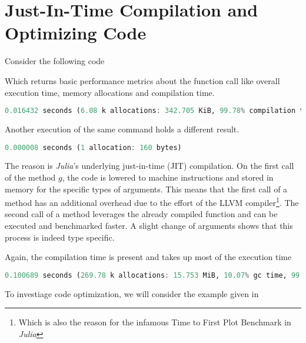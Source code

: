 \section{ Just-In-Time Compilation and Optimizing Code}
\label{JM:sec:design}

Consider the following code



Which returns basic performance metrics about the function call like overall execution time, memory allocations and compilation time.

\begin{lstlisting}[language=Julia]
    0.016432 seconds (6.08 k allocations: 342.705 KiB, 99.78% compilation time)
\end{lstlisting}

Another execution of the same command holds a different result.

\begin{lstlisting}[language=Julia]
    0.000008 seconds (1 allocation: 160 bytes)
\end{lstlisting}

The reason is \textit{Julia}'s underlying just-in-time (JIT) compilation. On the first call of the method $g$, 
the code is lowered to machine instructions and stored in memory for the specific types of arguments. This means that the first 
call of a method has an additional overhead due to the effort of the LLVM compiler\footnote{Which is also the reason for the infamous Time to First Plot Benchmark in \textit{Julia}}.
The second call of a method leverages the already compiled function and can be executed and benchmarked faster. A slight change of arguments shows that this process is indeed type specific.



Again, the compilation time is present and takes up most of the execution time

\begin{lstlisting}[language=Julia]
    0.100689 seconds (269.78 k allocations: 15.753 MiB, 10.07% gc time, 99.92% compilation time)
\end{lstlisting}

To investiage code optimization, we will consider the example given in \cite[p. 178 ff.]{JMSengupta2019}


